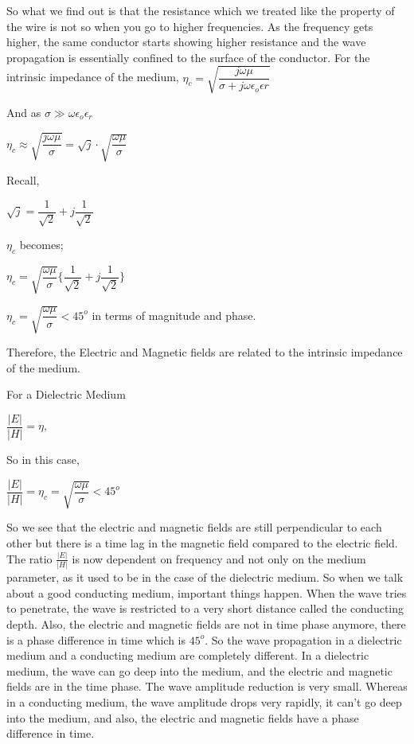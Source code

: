 So what we find out is that the resistance which we treated like the property of the wire is not so when you go to higher frequencies. As the frequency gets higher, the same conductor starts showing higher resistance and the wave propagation is essentially confined to the surface of the conductor.
For the intrinsic impedance of the medium, $\eta_{c}=\sqrt{\dfrac{j\omega\mu}{\sigma+j\omega\epsilon_{o}\epsilon{r}}}$

And as $\sigma\gg\omega\epsilon_{o}\epsilon_{r}$
\begin{center}
$\eta_{c}\approx\sqrt{\dfrac{j\omega\mu}{\sigma}}=\sqrt{j}\cdot\sqrt{\dfrac{\omega\mu}{\sigma}}$
\end{center}

Recall,
\begin{center}
$\sqrt{j}=\dfrac{1}{\sqrt{2}}+j\dfrac{1}{\sqrt{2}}$
\end{center}

$\eta_{c}$ becomes;
\begin{center}
$\eta_{c}=\sqrt{\dfrac{\omega\mu}{\sigma}}\Bigg\{\dfrac{1}{\sqrt{2}}+j\dfrac{1}{\sqrt{2}}\Bigg\}$
\end{center} 

\begin{center}
$\eta_{c}=\sqrt{\dfrac{\omega\mu}{\sigma}}<45^{o}$ in terms of magnitude and phase.
\end{center}

Therefore, the Electric and Magnetic fields are related to the intrinsic impedance of the medium.\newline

For a Dielectric Medium
\begin{center}
$\dfrac{|E|}{|H|}=\eta,$\newline
\end{center}

So in this case, \newline

$\dfrac{|E|}{|H|}=\eta_{c}=\sqrt{\dfrac{\omega\mu}{\sigma}}<45^{o}$

So we see that the electric and magnetic fields are still perpendicular to each other but there is a time lag in the magnetic field compared to the electric field. The ratio $\frac{|E|}{|H|}$ is now dependent on frequency and not only on the medium parameter, as it used to be in the case of the dielectric medium. So when we talk about a good conducting medium, important things happen.\newline
When the wave tries to penetrate, the wave is restricted to a very short distance called the conducting depth. Also, the electric and magnetic fields are not in time phase anymore, there is a phase difference in time which is $ 45^{o} $.\newline
So the wave propagation in a dielectric medium and a conducting medium are completely different. In a dielectric medium, the wave can go deep into the medium, and the electric and magnetic fields are in the time phase. The wave amplitude reduction is very small. Whereas in a conducting medium, the wave amplitude drops very rapidly, it can't go deep into the medium, and also, the electric and magnetic fields have a phase difference in time.

